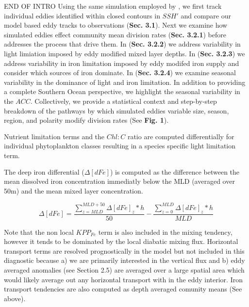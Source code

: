 END OF INTRO
Using the same simulation employed by \textcite{SongSeasonalvariationcorrelation2018}, we first track individual eddies identified within closed contours in $SSH'$ and compare our model based eddy tracks to observations (\textbf{Sec. 3.1}). Next we examine how simulated eddies effect community mean division rates (\textbf{Sec. 3.2.1}) before addresses the process that drive them. In (\textbf{Sec. 3.2.2}) we address variability in light limiation imposed by eddy modified mixed layer depths. In (\textbf{Sec. 3.2.3}) we address variability in iron limitation imposed by eddy modifed iron supply and consider which sources of iron dominate. In (\textbf{Sec. 3.2.4}) we examine seasonal variability in the dominance of light and iron limitation. In addition to providing a complete Southern Ocean perspective,  we highlight the seasonal variability in the $ACC$. Collectively, we provide a statistical context and step-by-step breakdown of the pathways by which simulated eddies variable size, season, region, and polarity modify division rates (See \textbf{Fig. 1}).







Nutrient limitation terms and the $Chl:C$ ratio are computed differentially for individual phytoplankton classes resulting in a species specific light limitation term.

The deep iron differential ($\Delta[dFe]$) is computed as the difference between the mean dissolved iron concentration immediatly below the MLD (averaged over 50m) and the mean mixed layer concentration. 

\begin{equation}
   \Delta[dFe] = \frac{\sum_{z=MLD}^{MLD+50}\Delta[dFe]_z*h}{50} - \frac{\sum_{z=0}^{MLD}\Delta[dFe]_z*h}{MLD}
\end{equation}


Note that the non local $KPP_{Fe}$ term is also included in the mixing tendency, however it tends to be dominated by the local diabatic mixing flux.  Horizontal transport terms are resolved prognostically in the model but not included in this diagnostic because a) we are primarily interested in the vertical flux and b) eddy averaged anomalies (see Section 2.5) are averaged over a large spatial area which would likely average out any horizontal transport with in the eddy interior. Iron transport tendencies are also computed as depth averaged comunity means (See above). 




